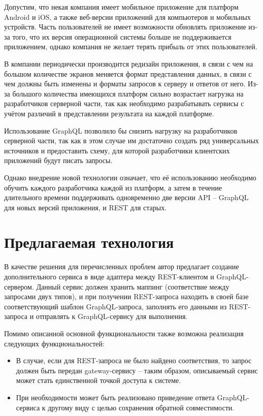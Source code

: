 Допустим, что некая компания имеет мобильное приложение для платформ Android и iOS, а также веб-версии приложений для компьютеров и мобильных устройств.
Часть пользователей не имеет возможности обновлять приложение из-за того, что их версия операционной системы больше не поддерживается приложением, однако компания не желает терять прибыль от этих пользователей.

В компании периодически производится редизайн приложения, в связи с чем на большом количестве экранов меняется формат представления данных, в связи с чем должны быть изменены и форматы запросов к серверу и ответов от него.
Из-за большого количества имеющихся платформ сильно возрастает нагрузка на разработчиков серверной части, так как необходимо разрабатывать сервисы с учётом различий в представлении результата на каждой платформе.

Использование GraphQL позволило бы снизить нагрузку на разработчиков серверной части, так как в этом случае им достаточно создать ряд универсальных источников и предоставить схему, для которой разработчики клиентских приложений будут писать запросы.

Однако внедрение новой технологии означает, что её использованию необходимо обучить каждого разработчика каждой из платформ, а затем в течение длительного времени поддерживать одновременно две версии API – GraphQL для новых версий приложения, и REST для старых.


\section{Предлагаемая технология}\label{sec:proposed-technology}

В качестве решения для перечисленных проблем автор предлагает создание дополнительного сервиса в виде адаптера между REST-клиентом и GraphQL-сервером.
Данный сервис должен хранить маппинг (соответствие между запросами двух типов), и при получении REST-запроса находить в своей базе соответствующий шаблон GraphQL-запроса, заполнять его данными из REST-запроса и отправлять к GraphQL-сервису для выполнения.

Помимо описанной основной функциональности также возможна реализация следующих функциональностей:

\begin{itemize}
	\item В случае, если для REST-запроса не было найдено соответствия, то запрос должен быть передан gateway-сервису – таким образом, описываемый сервис может стать единственной точкой доступа к системе.
	\item При необходимости может быть реализовано приведение ответа GraphQL-сервиса к другому виду с целью сохранения обратной совместимости.
\end{itemize}

